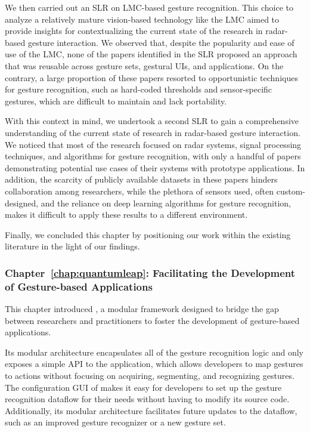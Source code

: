 We then carried out an SLR on LMC-based gesture recognition. This choice to analyze a relatively mature vision-based technology like the LMC aimed to provide insights for contextualizing the current state of the research in radar-based gesture interaction.
%
We observed that, despite the popularity and ease of use of the LMC, none of the papers identified in the SLR proposed an approach that was reusable across gesture sets, gestural UIs, and applications. On the contrary, a large proportion of these papers resorted to opportunistic techniques for gesture recognition, such as hard-coded thresholds and sensor-specific gestures, which are difficult to maintain and lack portability.

With this context in mind, we undertook a second SLR to gain a comprehensive understanding of the current state of research in radar-based gesture interaction. We noticed that most of the research focused on radar systems, signal processing techniques, and algorithms for gesture recognition, with only a handful of papers demonstrating potential use cases of their systems with prototype applications. 
%
In addition, the scarcity of publicly available datasets in these papers hinders collaboration among researchers, while the plethora of sensors used, often custom-designed, and the reliance on deep learning algorithms for gesture recognition, makes it difficult to apply these results to a different environment.

Finally, we concluded this chapter by positioning our work within the existing literature in the light of our findings.

\subsubsection{Chapter~\ref{chap:quantumleap}: Facilitating the Development of Gesture-based Applications}
This chapter introduced \ql, a modular framework designed to bridge the gap between researchers and practitioners to foster the development of gesture-based applications.

Its modular architecture encapsulates all of the gesture recognition logic and only exposes a simple API to the application, which allows developers to map gestures to actions without focusing on acquiring, segmenting, and recognizing gestures. The configuration GUI of \ql makes it easy for developers to set up the gesture recognition dataflow for their needs without having to modify its source code. Additionally, its modular architecture facilitates future updates to the dataflow, such as an improved gesture recognizer or a new gesture set.

